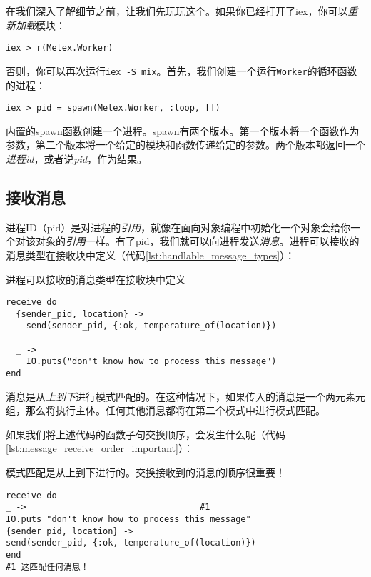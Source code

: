 在我们深入了解细节之前，让我们先玩玩这个。如果你已经打开了iex，你可以\emph{重新加载}模块：

\begin{code}{}
\begin{verbatim}
iex > r(Metex.Worker)
\end{verbatim}
\end{code}

否则，你可以再次运行\texttt{iex -S mix}。首先，我们创建一个运行\texttt{Worker}的循环函数的进程：

\begin{code}{}
\begin{verbatim}
iex > pid = spawn(Metex.Worker, :loop, [])
\end{verbatim}
\end{code}

内置的spawn函数创建一个进程。spawn有两个版本。第一个版本将一个函数作为参数，第二个版本将一个给定的模块和函数传递给定的参数。两个版本都返回一个\emph{进程id}，或者说\emph{pid}，作为结果。

\subsection{接收消息}

进程ID（pid）是对进程的\emph{引用}，就像在面向对象编程中初始化一个对象会给你一个对该对象的\emph{引用}一样。有了pid，我们就可以向进程发送\emph{消息}。进程可以接收的消息类型在接收块中定义（代码\ref{lst:handlable_message_types}）：


\begin{code}{进程可以接收的消息类型在接收块中定义}
\begin{verbatim}
receive do
  {sender_pid, location} ->
    send(sender_pid, {:ok, temperature_of(location)})

  _ ->
    IO.puts("don't know how to process this message")
end
\end{verbatim}
\label{lst:handlable_message_types}
\end{code}

消息是从\emph{上到下}进行模式匹配的。在这种情况下，如果传入的消息是一个两元素元组，那么将执行主体。任何其他消息都将在第二个模式中进行模式匹配。

如果我们将上述代码的函数子句交换顺序，会发生什么呢（代码\ref{lst:message_receive_order_important}）：


\begin{code}{模式匹配是从上到下进行的。交换接收到的消息的顺序很重要！}
\begin{verbatim}
receive do
_ ->                                  #1
IO.puts "don't know how to process this message"
{sender_pid, location} ->
send(sender_pid, {:ok, temperature_of(location)})
end
#1 这匹配任何消息！
\end{verbatim}
\label{lst:message_receive_order_important}
\end{code}

